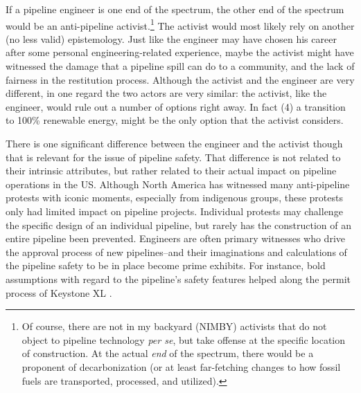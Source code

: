 \documentclass[12pt, man, natbib]{apa6}
\begin{document}
	If a pipeline engineer is one end of the spectrum, the other end of the spectrum would be an anti-pipeline activist.\footnote{Of course, there are not in my backyard (NIMBY) activists that do not object to pipeline technology \textit{per se}, but take offense at the specific location of construction. At the actual \textit{end} of the spectrum, there would be a proponent of decarbonization (or at least far-fetching changes to how fossil fuels are transported, processed, and utilized).} The activist would most likely rely on another (no less valid) epistemology. Just like the engineer may have chosen his career after some personal engineering-related experience, maybe the activist might have witnessed the damage that a pipeline spill can do to a community, and the lack of fairness in the restitution process. Although the activist and the engineer are very different, in one regard the two actors are very similar: the activist, like the engineer, would rule out a number of options right away. In fact (4) a transition to 100\% renewable energy, might be the only option that the activist considers.
	
	There is one significant difference between the engineer and the activist though that is relevant for the issue of pipeline safety. That difference is not related to their intrinsic attributes, but rather related to their actual impact on pipeline operations in the US. Although North America has witnessed many anti-pipeline protests with iconic moments, especially from indigenous groups, these protests only had limited impact on pipeline projects. Individual protests may challenge the specific design of an individual pipeline, but rarely has the construction of an entire pipeline been prevented. Engineers are often primary witnesses who drive the approval process of new pipelines--and their imaginations and calculations of the pipeline safety to be in place become prime exhibits. For instance, bold assumptions with regard to the pipeline's safety features helped along the permit process of Keystone XL \citep{Stansbury2011}.
	
\end{document}
